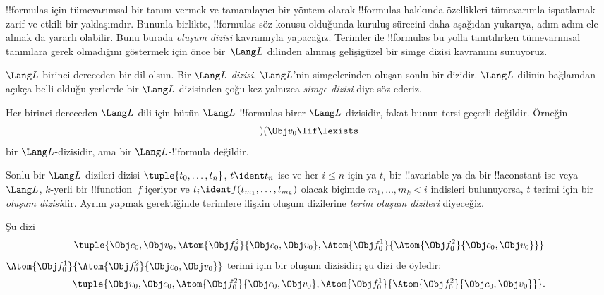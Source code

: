 



!!{formula}s için tümevarımsal bir tanım vermek ve tamamlayıcı bir
yöntem olarak !!{formula}s hakkında özellikleri tümevarımla ispatlamak zarif
ve etkili bir yaklaşımdır. Bununla birlikte, !!{formula}s söz konusu
olduğunda kuruluş sürecini daha aşağıdan yukarıya, adım adım ele almak da yararlı olabilir. Bunu
burada \emph{oluşum dizisi} kavramıyla yapacağız.
%
Terimler ile !!{formula}s bu yolla tanıtılırken tümevarımsal tanımlara
gerek olmadığını göstermek için önce bir~$\Lang L$ dilinden
alınmış gelişigüzel bir simge dizisi kavramını sunuyoruz.

\begin{defn}
$\Lang L$ birinci dereceden bir dil olsun. Bir \emph{$\Lang L$-dizisi},
$\Lang L$'nin simgelerinden oluşan sonlu bir dizidir. $\Lang L$ dilinin
bağlamdan açıkça belli olduğu yerlerde bir $\Lang L$-dizisinden çoğu
kez yalnızca \emph{simge dizisi} diye söz ederiz.
\end{defn}

\begin{ex}
Her birinci dereceden $\Lang L$ dili için bütün
$\Lang L$-!!{formula}s birer $\Lang L$-dizisidir, fakat bunun tersi
geçerli değildir. Örneğin 
\[)(\Obj v_0\lif\lexists\]
bir $\Lang L$-dizisidir, ama bir $\Lang L$-!!{formula} değildir.
\end{ex}

\begin{defn}
Sonlu bir $\Lang L$-dizileri dizisi $\tuple{t_0,\dotsc,t_n}$, $t \ident
t_n$ ise ve her $i \leq n$ için ya $t_i$ bir !!a{variable} ya da bir
!!a{constant} ise veya $\Lang L$, $k$-yerli bir !!{function}~$f$
içeriyor ve $t_i \ident f(t_{m_1},\dotsc,t_{m_k})$ olacak biçimde
$m_1,\dotsc,m_k < i$ indisleri bulunuyorsa, $t$ terimi için bir
\emph{oluşum dizisi}dir. Ayrım yapmak gerektiğinde terimlere ilişkin
oluşum dizilerine \emph{terim oluşum dizileri} diyeceğiz.
\end{defn}

\begin{ex}
Şu dizi
\[
    \tuple{\Obj c_0, \Obj v_0, \Atom{\Obj f^2_0}{\Obj c_0, \Obj v_0}, \Atom{\Obj f^1_0}{\Atom{\Obj f^2_0}{\Obj c_0, \Obj v_0}}}
\]
$\Atom{\Obj f^1_0}{\Atom{\Obj f^2_0}{\Obj c_0, \Obj v_0}}$ terimi için
bir oluşum dizisidir; şu dizi de öyledir:
\[
    \tuple{\Obj v_0, \Obj c_0, \Atom{\Obj f^2_0}{\Obj c_0, \Obj v_0}, \Atom{\Obj f^1_0}{\Atom{\Obj f^2_0}{\Obj c_0, \Obj v_0}}}.
\]
\end{ex}

